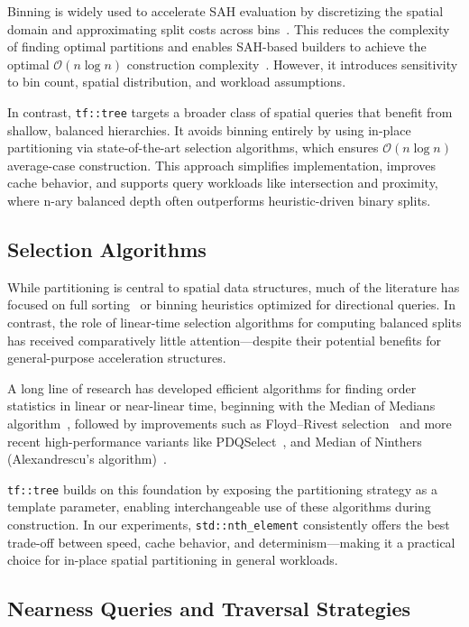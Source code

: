 Binning is widely used to accelerate SAH evaluation by discretizing
the spatial domain and approximating split costs across bins~\cite{wald2007fast}.
This reduces the complexity of finding optimal partitions and enables
SAH-based builders to achieve the optimal $\mathcal{O}(n \log n)$
construction complexity~\cite{kdtreeologn}. However, it introduces
sensitivity to bin count, spatial distribution, and workload assumptions.

In contrast, \texttt{tf::tree} targets a broader class of spatial queries
that benefit from shallow, balanced hierarchies. It avoids binning entirely
by using in-place partitioning via state-of-the-art selection algorithms,
which ensures
$\mathcal{O}(n \log n)$ average-case construction. This approach simplifies
implementation, improves cache behavior, and supports query workloads
like intersection and proximity, where n-ary balanced depth often outperforms
heuristic-driven binary splits.

\subsection{Selection Algorithms}

While partitioning is central to spatial data structures,
much of the literature has focused on full sorting~\cite{str-tree}
or binning heuristics optimized for directional queries.
In contrast, the role of linear-time selection algorithms for computing
balanced splits has received comparatively little attention—despite
their potential benefits for general-purpose acceleration structures.

A long line of research has developed efficient algorithms for
finding order statistics in linear or near-linear time, beginning
with the Median of Medians algorithm~\cite{mom}, followed by
improvements such as Floyd--Rivest selection~\cite{floyd1975expected}
and more recent high-performance variants like PDQSelect~\cite{pdqSort},
and Median of Ninthers (Alexandrescu’s algorithm)~\cite{alexandrescu-sorting}.

\texttt{tf::tree} builds on this foundation by exposing the partitioning
strategy as a template parameter, enabling interchangeable use of these
algorithms during construction. In our experiments,
\texttt{std::nth\_element} consistently offers the best trade-off between
speed, cache behavior, and determinism—making it a practical choice
for in-place spatial partitioning in general workloads.

\subsection{Nearness Queries and Traversal Strategies}

